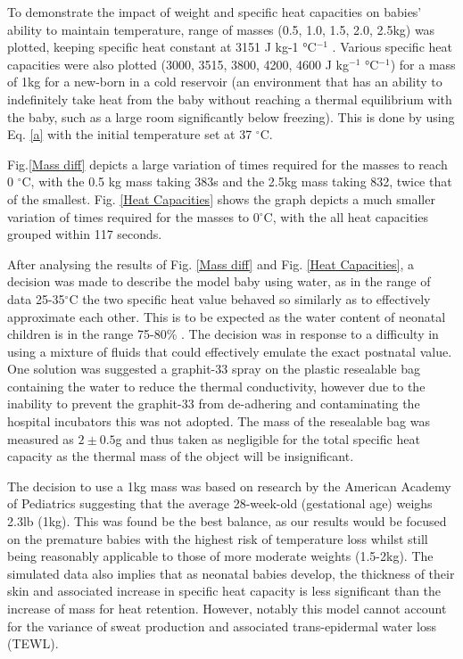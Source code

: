 \documentclass{article}
\begin{document}
To demonstrate the impact of weight and specific heat capacities on babies' ability to maintain temperature, range of masses (0.5, 1.0, 1.5, 2.0, 2.5kg) was plotted, keeping specific heat constant at 3151 J kg-1 °C$^{-1}$ . Various specific heat capacities were also plotted (3000, 3515, 3800, 4200, 4600 J kg$^{-1}$ °C$^{-1}$) for a mass of 1kg for a new-born in a cold reservoir (an environment that has an ability to indefinitely take heat from the baby without reaching a thermal equilibrium with the baby, such as a large room significantly below freezing). This is done by using Eq. \ref{a} with the initial temperature set at 37 $^{\circ}$C. 

\vspace{3mm}

Fig.\ref{Mass diff} depicts a large variation of times required for the masses to reach 0 $^{\circ}$C, with the 0.5 kg mass taking 383s and the 2.5kg mass taking 832, twice that of the smallest. Fig. \ref{Heat Capacities} shows the graph depicts a much smaller variation of times required for the masses to 0$^{\circ}$C, with the all heat capacities grouped within 117 seconds. 

\vspace{3mm}

After analysing the results of Fig. \ref{Mass diff} and Fig. \ref{Heat Capacities}, a decision was made to describe the model baby using water, as in the range of data 25-35$^{\circ}$C the two specific heat value behaved so similarly as to effectively approximate each other. This is to be expected as the water content of neonatal children is in the range 75-80\% \cite{BTT3}. The decision was in response to a difficulty in using a mixture of fluids that could effectively emulate the exact postnatal value. One solution was suggested a graphit-33 spray \cite{BTT2} on the plastic resealable bag containing the water to reduce the thermal conductivity, however due to the inability to  prevent the graphit-33 from de-adhering and contaminating the hospital incubators this was not adopted. The mass of the resealable bag was measured as $2 \pm 0.5$g and thus taken as negligible for the total specific heat capacity as the thermal mass of the object will be insignificant.  

\vspace{3mm}

The decision to use a 1kg mass was based on research by the American Academy of Pediatrics \cite{BTT4} suggesting that the average 28-week-old (gestational age) weighs 2.3lb (1kg). This was found be the best balance, as our results would be focused on the premature babies with the highest risk of temperature loss whilst still being reasonably applicable to those of more moderate weights (1.5-2kg). The simulated data also implies that as neonatal babies develop, the thickness of their skin and associated increase in specific heat capacity is less significant than the increase of mass for heat retention. However, notably this model cannot account for the variance of sweat production and associated trans-epidermal water loss (TEWL).  
\end{document}
